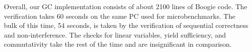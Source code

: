 Overall, our GC implementation consists of about 2100 lines of Boogie code.
The verification takes 60 seconds on the same PC used for microbenchmarks.
The bulk of this time, 54 seconds, is taken by the verification of
sequential correctness and non-interference.
The checks for linear variables, yield sufficiency, and commutativity take the rest of the time and are insignificant in comparison.




